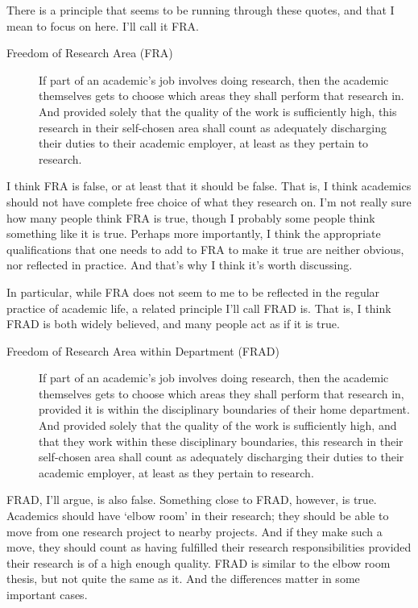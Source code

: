 \documentclass[
  10pt,
  letterpaper,
  DIV=11,
  numbers=noendperiod,
  twoside]{scrartcl}
\begin{document}
There is a principle that seems to be running through these quotes, and
that I mean to focus on here. I'll call it FRA.

\begin{description}
\item[Freedom of Research Area (FRA)]
If part of an academic's job involves doing research, then the academic
themselves gets to choose which areas they shall perform that research
in. And provided solely that the quality of the work is sufficiently
high, this research in their self-chosen area shall count as adequately
discharging their duties to their academic employer, at least as they
pertain to research.
\end{description}

I think FRA is false, or at least that it should be false. That is, I
think academics should not have complete free choice of what they
research on. I'm not really sure how many people think FRA is true,
though I probably some people think something like it is true. Perhaps
more importantly, I think the appropriate qualifications that one needs
to add to FRA to make it true are neither obvious, nor reflected in
practice. And that's why I think it's worth discussing.

In particular, while FRA does not seem to me to be reflected in the
regular practice of academic life, a related principle I'll call FRAD
is. That is, I think FRAD is both widely believed, and many people act
as if it is true.

\begin{description}
\item[Freedom of Research Area within Department (FRAD)]
If part of an academic's job involves doing research, then the academic
themselves gets to choose which areas they shall perform that research
in, provided it is within the disciplinary boundaries of their home
department. And provided solely that the quality of the work is
sufficiently high, and that they work within these disciplinary
boundaries, this research in their self-chosen area shall count as
adequately discharging their duties to their academic employer, at least
as they pertain to research.
\end{description}

FRAD, I'll argue, is also false. Something close to FRAD, however, is
true. Academics should have `elbow room' in their research; they should
be able to move from one research project to nearby projects. And if
they make such a move, they should count as having fulfilled their
research responsibilities provided their research is of a high enough
quality. FRAD is similar to the elbow room thesis, but not quite the
same as it. And the differences matter in some important cases.
\end{document}
